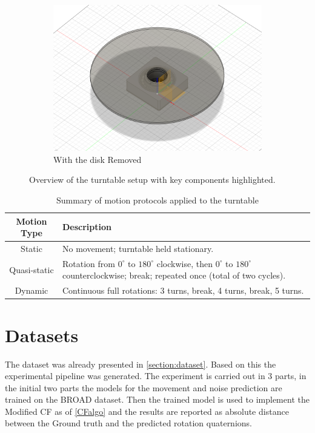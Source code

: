 \documentclass{iutbscthesis}
\begin{document}
\begin{figure}[h!]
\begin{subfigure}[b]{0.3\textwidth}
        \includegraphics[width=\textwidth]{Turntable_fusion.png}
        \caption{With the disk Removed}
        \label{fig:no disk}
    \end{subfigure}
    \caption{Overview of the turntable setup with key components highlighted.}
    \label{fig:turntable_overview}
\end{figure}


\begin{table}[h!] \label{tab:motion_protocols}
\centering
\caption{Summary of motion protocols applied to the turntable}
    \begin{tabular}{|c|p{10cm}|}
    \hline
    \textbf{Motion Type} & \textbf{Description} \\
    \hline
    Static & No movement; turntable held stationary. \\
    \hline
    Quasi-static & Rotation from $0^{\circ}$ to $180^{\circ}$ clockwise, then $0^{\circ}$ to $180^{\circ}$ counterclockwise; break; repeated once (total of two cycles). \\
    \hline
    Dynamic & Continuous full rotations: 3 turns, break, 4 turns, break, 5 turns. \\
    \hline
    \end{tabular}
\end{table}


\section{Datasets}
The dataset was already presented in \autoref{section:dataset}. Based on this the experimental pipeline was generated. The experiment is carried out in 3 parts, in the initial two parts the models for the movement and noise prediction are trained on the BROAD\cite{BROAD} dataset. Then the trained model is used to implement the Modified CF as of \autoref{CFalgo} and the results are reported as absolute distance between the Ground truth and the predicted rotation quaternions\cite{absoluteDistance}.
\end{document}
